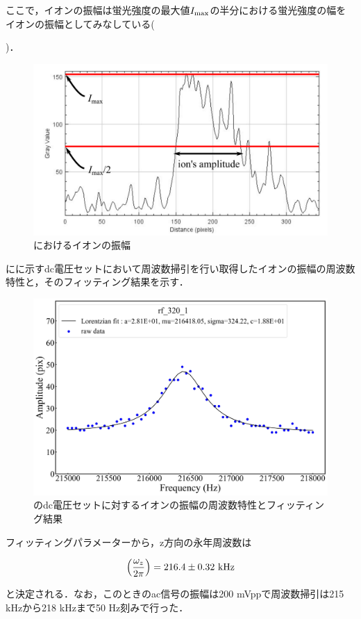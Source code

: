ここで，イオンの振幅は蛍光強度の最大値$I_{\rm max}$の半分における蛍光強度の幅をイオンの振幅としてみなしている({)．

\begin{figure}[h]
	\begin{center}
		\includegraphics[width = 0.6\linewidth]{./methods/figure/PlotOf_resonance.png}
		\caption{におけるイオンの振幅}
		\label{fig:example_resonance_Amp}
	\end{center}
\end{figure}

にに示すdc電圧セットにおいて周波数掃引を行い取得したイオンの振幅の周波数特性と，そのフィッティング結果を示す．

\begin{figure}[h]
	\centering
		\includegraphics[width = 0.6\linewidth]{./methods/figure/fitting_result.jpg}
		\caption{のdc電圧セットに対するイオンの振幅の周波数特性とフィッティング結果}
		\label{fig:fitting_result}
\end{figure}

フィッティングパラメーターから，z方向の永年周波数は

\begin{align}
\left( \frac{\omega_z}{2\pi}\right) = 216.4 \pm 0.32 \  {\rm kHz} \notag
\end{align}

と決定される．なお，このときのac信号の振幅は200 mVppで周波数掃引は215 kHzから218 kHzまで50 Hz刻みで行った．

}
